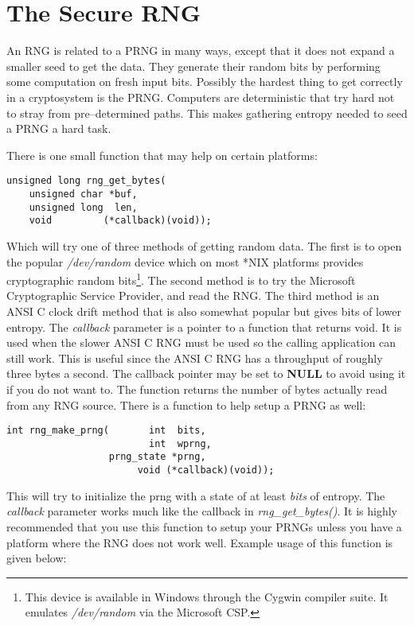 \documentclass[synpaper]{book}
\newcommand{\mysection}[1]    %
	{                   %
	\section{#1}
   \markboth{\textsf{www.libtom.org}}{\thesection ~ {#1}}
	}
\begin{document}
\mysection{The Secure RNG}
An RNG is related to a PRNG in many ways, except that it does not expand a smaller seed to get the data.  They generate their random bits
by performing some computation on fresh input bits.  Possibly the hardest thing to get correctly in a cryptosystem is the
PRNG.  Computers are deterministic that try hard not to stray from pre--determined paths.  This makes gathering entropy needed to seed a PRNG
a hard task.

There is one small function that may help on certain platforms:
\begin{verbatim}
unsigned long rng_get_bytes(
    unsigned char *buf,
    unsigned long  len,
    void         (*callback)(void));
\end{verbatim}

Which will try one of three methods of getting random data.  The first is to open the popular \textit{/dev/random} device which
on most *NIX platforms provides cryptographic random bits\footnote{This device is available in Windows through the Cygwin compiler suite.  It emulates \textit{/dev/random} via the Microsoft CSP.}.
The second method is to try the Microsoft Cryptographic Service Provider, and read the RNG.  The third method is an ANSI C
clock drift method that is also somewhat popular but gives bits of lower entropy.  The \textit{callback} parameter is a pointer to a function that returns void.  It is
used when the slower ANSI C RNG must be used so the calling application can still work.  This is useful since the ANSI C RNG has a throughput of roughly three
bytes a second.  The callback pointer may be set to {\bf NULL} to avoid using it if you do not want to.  The function returns the number of bytes actually read from
any RNG source.  There is a function to help setup a PRNG as well:
\begin{verbatim}
int rng_make_prng(       int  bits,
                         int  wprng,
                  prng_state *prng,
                       void (*callback)(void));
\end{verbatim}
This will try to initialize the prng with a state of at least \textit{bits} of entropy.  The \textit{callback} parameter works much like
the callback in \textit{rng\_get\_bytes()}.  It is highly recommended that you use this function to setup your PRNGs unless you have a
platform where the RNG does not work well.  Example usage of this function is given below:
\end{document}
